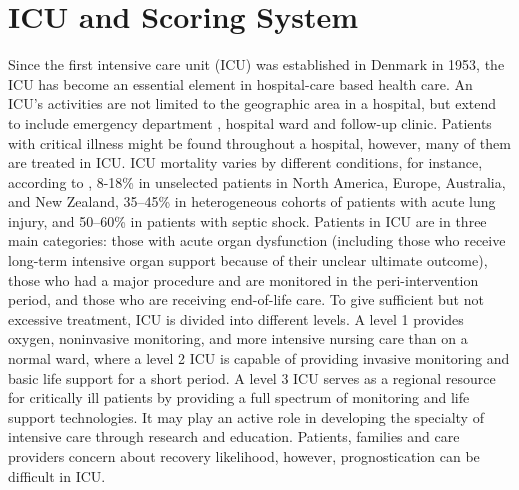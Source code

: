 \documentclass[12pt,a4paper,english
]{tunithesis}
\begin{document}
\section{ICU and Scoring System}
Since the first intensive care unit (ICU) was established in Denmark in 1953, the ICU has become an essential element in hospital-care based health care. An ICU's activities are not limited to the geographic area in a hospital, but extend to include emergency department , hospital ward and follow-up clinic. \parencite{Marshell2017} Patients with critical illness might be found throughout a hospital, however, many of them are treated in ICU. ICU mortality varies by different conditions, for instance, according to \textcite{Adhikari2010}, 8-18\% in unselected patients in North America, Europe, Australia, and New Zealand, 35–45\% in heterogeneous cohorts of patients with acute lung injury, and 50–60\% in patients with septic shock. Patients in ICU are in three main categories: those with acute organ dysfunction (including those who receive long-term intensive organ support because of their unclear ultimate outcome), those who had a major procedure and are monitored in the peri-intervention period, and those who are receiving end-of-life care. To give sufficient but not excessive treatment, ICU is divided into different levels. A level 1 provides oxygen, noninvasive monitoring, and more intensive nursing care than on a normal ward, where a level 2 ICU is capable of providing invasive monitoring and basic life support for a short period. A level 3 ICU serves as a regional resource for critically ill patients by providing a full spectrum of monitoring and life support technologies. It may play an active role in developing the specialty of intensive care through research and education. \parencite{Marshell2017} Patients, families and care providers concern about recovery likelihood, however, prognostication can be difficult in ICU. \parencite{Tiffany21}
\end{document}
